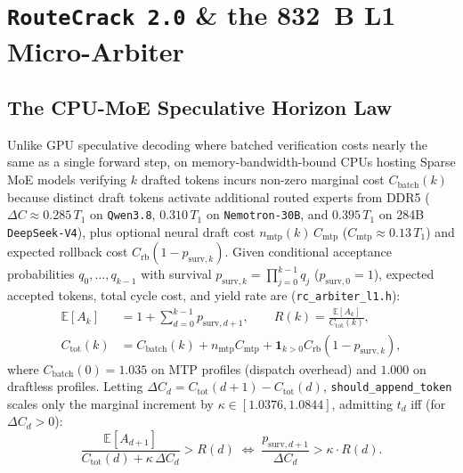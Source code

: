 \documentclass[10pt,twocolumn]{article}
\begin{document}
\section{\texttt{RouteCrack 2.0} \& the 832~B L1 Micro-Arbiter}
\label{sec:spec}

\subsection{The CPU-MoE Speculative Horizon Law}
Unlike GPU speculative decoding \cite{leviathan2023fast} where batched verification costs nearly the same as a single forward step, on memory-bandwidth-bound CPUs hosting Sparse MoE models verifying $k$ drafted tokens incurs non-zero marginal cost $C_{\text{batch}}(k)$ because distinct draft tokens activate additional routed experts from DDR5 ($\Delta C \approx 0.285\,T_1$ on \texttt{Qwen3.8}, $0.310\,T_1$ on \texttt{Nemotron-30B}, and $0.395\,T_1$ on 284B \texttt{DeepSeek-V4}), plus optional neural draft cost $n_{\text{mtp}}(k)\,C_{\text{mtp}}$ ($C_{\text{mtp}} \approx 0.13\,T_1$) and expected rollback cost $C_{\text{rb}}(1 - p_{\text{surv},k})$. Given conditional acceptance probabilities $q_0,\dots,q_{k-1}$ with survival $p_{\text{surv},k} = \prod_{j=0}^{k-1} q_j$ ($p_{\text{surv},0} = 1$), expected accepted tokens, total cycle cost, and yield rate are (\texttt{rc\_arbiter\_l1.h}):
\begin{align}
    \mathbb{E}[A_k] &= 1 + \sum_{d=0}^{k-1} p_{\text{surv},d+1}, \qquad R(k) = \frac{\mathbb{E}[A_k]}{C_{\text{tot}}(k)}, \\
    C_{\text{tot}}(k) &= C_{\text{batch}}(k) + n_{\text{mtp}} C_{\text{mtp}} + \mathbf{1}_{k>0} C_{\text{rb}}(1\!-\!p_{\text{surv},k}),
\end{align}
where $C_{\text{batch}}(0) = 1.035$ on MTP profiles (dispatch overhead) and $1.000$ on draftless profiles. Letting $\Delta C_d = C_{\text{tot}}(d+1) - C_{\text{tot}}(d)$, \texttt{should\_append\_token} scales only the marginal increment by $\kappa \in [1.0376, 1.0844]$, admitting $t_d$ iff (for $\Delta C_d > 0$):
\begin{equation}
    \frac{\mathbb{E}[A_{d+1}]}{C_{\text{tot}}(d) + \kappa\,\Delta C_d} > R(d) \;\Longleftrightarrow\; \frac{p_{\text{surv},d+1}}{\Delta C_d} > \kappa \cdot R(d).
\end{equation}
\end{document}
